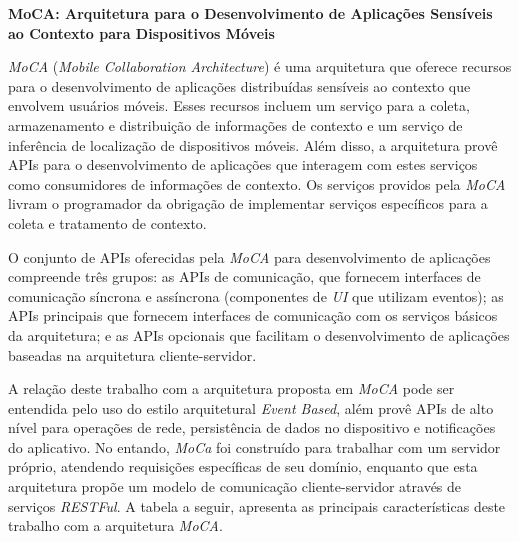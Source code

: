 \textbf{MoCA: Arquitetura para o Desenvolvimento de Aplicações Sensíveis ao Contexto para Dispositivos Móveis} \cite{moca_2004}\par
\textit{MoCA} (\textit{Mobile Collaboration Architecture}) é uma arquitetura que oferece recursos para o desenvolvimento de aplicações distribuídas sensíveis ao contexto que envolvem usuários móveis. Esses recursos incluem um serviço para a coleta, armazenamento e distribuição de informações de contexto e um serviço de inferência de localização de dispositivos móveis. Além disso, a arquitetura provê APIs para o desenvolvimento de aplicações que interagem com estes serviços como consumidores de informações de contexto. Os serviços providos pela \textit{MoCA} livram o programador da obrigação de implementar serviços específicos para a coleta e tratamento de contexto.\par
O conjunto de APIs oferecidas pela \textit{MoCA} para desenvolvimento de aplicações compreende três grupos: as APIs de comunicação, que fornecem interfaces de comunicação síncrona e assíncrona (componentes de \textit{UI} que utilizam eventos); as APIs principais que fornecem interfaces de comunicação com os serviços básicos da arquitetura; e as APIs opcionais que facilitam o desenvolvimento de aplicações baseadas na arquitetura cliente-servidor.\par

A relação deste trabalho com a arquitetura proposta em \textit{MoCA} pode ser entendida pelo uso do estilo arquitetural \textit{Event Based}, além provê APIs de alto nível para operações de rede, persistência de dados no dispositivo e notificações do aplicativo. No entando, \textit{MoCa} foi construído para trabalhar com um servidor próprio, atendendo requisições específicas de seu domínio, enquanto que esta arquitetura propõe um modelo de comunicação cliente-servidor através de serviços \textit{RESTFul}. A tabela a seguir, apresenta as principais características deste trabalho com a arquitetura \textit{MoCA}.

